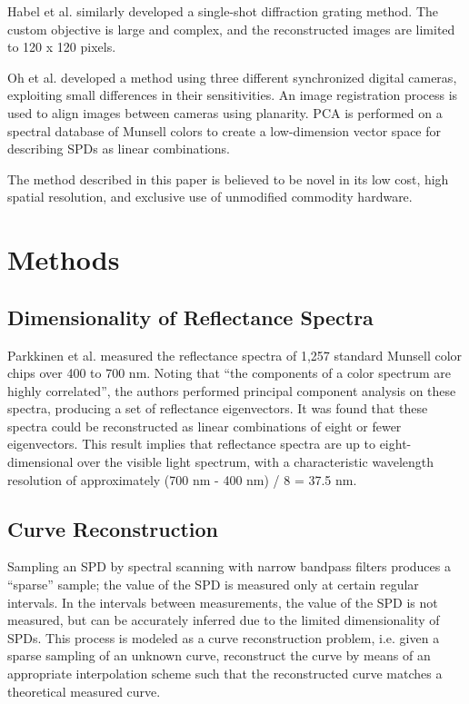 \documentclass[twocolumn,10pt]{asme2ej}
\newcommand{\id}{\hspace{6 mm}}
\begin{document}
\id Habel et al. \cite{Habel} similarly developed a single-shot diffraction grating method. The custom objective is large and complex, and the reconstructed images are limited to 120 x 120 pixels.

\id Oh et al. \cite{Oh} developed a method using three different synchronized digital cameras, exploiting small differences in their sensitivities. An image registration process is used to align images between cameras using planarity. PCA is performed on a spectral database of Munsell colors to create a low-dimension vector space for describing SPDs as linear combinations.

\id The method described in this paper is believed to be novel in its low cost, high spatial resolution, and exclusive use of unmodified commodity hardware.

\section{Methods}

\subsection{Dimensionality of Reflectance Spectra}

Parkkinen et al. \cite{Parkkinen} measured the reflectance spectra of 1,257 standard Munsell color chips over 400 to 700 nm. Noting that ``the components of a color spectrum are highly correlated'', the authors performed principal component analysis on these spectra, producing a set of reflectance eigenvectors. It was found that these spectra could be reconstructed as linear combinations of eight or fewer eigenvectors. This result implies that reflectance spectra are up to eight-dimensional over the visible light spectrum, with a characteristic wavelength resolution of approximately (700 nm - 400 nm) / 8 = 37.5 nm.

\subsection{Curve Reconstruction}
\label{curve_reconstruction}

Sampling an SPD by spectral scanning with narrow bandpass filters produces a ``sparse'' sample; the value of the SPD is measured only at certain regular intervals. In the intervals between measurements, the value of the SPD is not measured, but can be accurately inferred due to the limited dimensionality of SPDs. This process is modeled as a curve reconstruction problem, i.e. given a sparse sampling of an unknown curve, reconstruct the curve by means of an appropriate interpolation scheme such that the reconstructed curve matches a theoretical measured curve.
\end{document}
